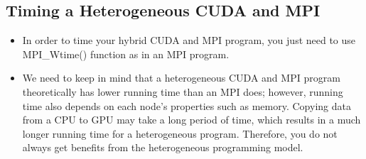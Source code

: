 \documentclass[letterpaper,10pt,openany,oneside]{sphinxmanual}
\begin{document}
\subsection{Timing a Heterogeneous CUDA and MPI}
\label{CodingAndCompiling/CodingAndCompiling:timing-a-heterogeneous-cuda-and-mpi}\begin{itemize}
\item {} 
In order to time your hybrid CUDA and MPI program, you just need to use MPI\_Wtime() function as in an MPI program.

\item {} 
We need to keep in mind that a heterogeneous CUDA and MPI program theoretically has lower running time than an MPI does; however, running time also depends on each node's properties such as memory. Copying data from a CPU to GPU may take a long period of time, which results in a much longer running time for a heterogeneous program. Therefore, you do not always get benefits from the heterogeneous programming model.

\end{itemize}
\end{document}
